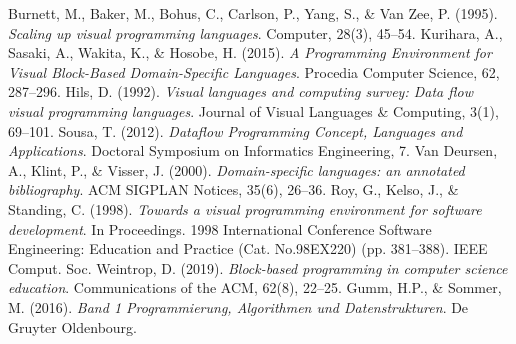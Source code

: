 \begin{thebibliography}{9}
        Burnett, M., Baker, M., Bohus, C., Carlson, P., Yang, S., \& Van Zee, P. (1995). \emph{Scaling up visual programming languages}. Computer, 28(3), 45–54.
        Kurihara, A., Sasaki, A., Wakita, K., \& Hosobe, H. (2015). \emph{A Programming Environment for Visual Block-Based Domain-Specific Languages}. Procedia Computer Science, 62, 287–296.
        Hils, D. (1992). \emph{Visual languages and computing survey: Data flow visual programming languages}. Journal of Visual Languages \& Computing, 3(1), 69–101.
        Sousa, T. (2012). \emph{Dataﬂow Programming Concept, Languages and Applications}. Doctoral Symposium on Informatics Engineering, 7.
        Van Deursen, A., Klint, P., \& Visser, J. (2000). \emph{Domain-specific languages: an annotated bibliography}. ACM SIGPLAN Notices, 35(6), 26–36.
        Roy, G., Kelso, J., \& Standing, C. (1998). \emph{Towards a visual programming environment for software development}. In Proceedings. 1998 International Conference Software Engineering: Education and Practice (Cat. No.98EX220) (pp. 381–388). IEEE Comput. Soc.
        Weintrop, D. (2019). \emph{Block-based programming in computer science education}. Communications of the ACM, 62(8), 22–25.
        Gumm, H.P., \& Sommer, M. (2016). \emph{Band 1 Programmierung, Algorithmen und Datenstrukturen}. De Gruyter Oldenbourg.
    \end{thebibliography}
    